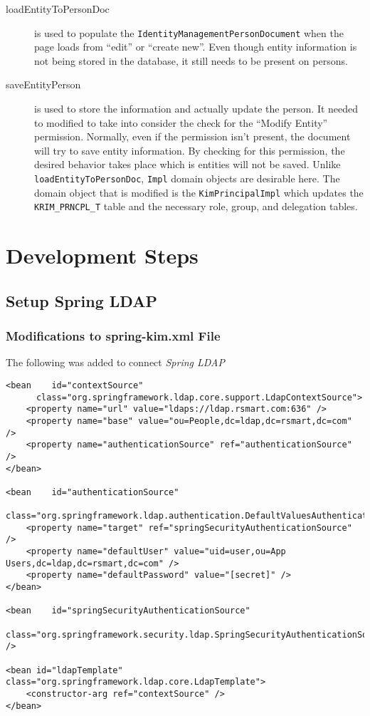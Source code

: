 \documentclass[12pt,notitlepage]{article}
\begin{document}
\begin{description}
\item[loadEntityToPersonDoc] is used to populate the \verb|IdentityManagementPersonDocument| when the
page loads from ``edit'' or ``create new''. Even though entity information is not being stored in the database,
it still needs to be present on persons.

\item[saveEntityPerson] is used to store the information and actually update the person. It needed to modified to 
take into consider the check for the ``Modify Entity'' permission. Normally, even if the permission isn't present,
the document will try to save entity information. By checking for this permission, the desired behavior takes
place which is entities will not be saved. Unlike \verb|loadEntityToPersonDoc|, \verb|Impl| domain objects are 
desirable here. The domain object that is modified is the \verb|KimPrincipalImpl| which updates the \verb|KRIM_PRNCPL_T|
table and the necessary role, group, and delegation tables.

\end{description}

\section{Development Steps}

\subsection{Setup Spring LDAP}

\subsubsection{Modifications to spring-kim.xml File}

The following was added to connect \emph{Spring LDAP}

\begin{lstlisting}
<bean    id="contextSource"
      class="org.springframework.ldap.core.support.LdapContextSource">
    <property name="url" value="ldaps://ldap.rsmart.com:636" />
    <property name="base" value="ou=People,dc=ldap,dc=rsmart,dc=com" />
    <property name="authenticationSource" ref="authenticationSource" />
</bean>

<bean    id="authenticationSource"
      class="org.springframework.ldap.authentication.DefaultValuesAuthenticationSourceDecorator">
    <property name="target" ref="springSecurityAuthenticationSource" />
    <property name="defaultUser" value="uid=user,ou=App Users,dc=ldap,dc=rsmart,dc=com" />
    <property name="defaultPassword" value="[secret]" />
</bean>

<bean    id="springSecurityAuthenticationSource"
      class="org.springframework.security.ldap.SpringSecurityAuthenticationSource" />

<bean id="ldapTemplate" class="org.springframework.ldap.core.LdapTemplate">
    <constructor-arg ref="contextSource" />
</bean>
\end{lstlisting}
\end{document}
